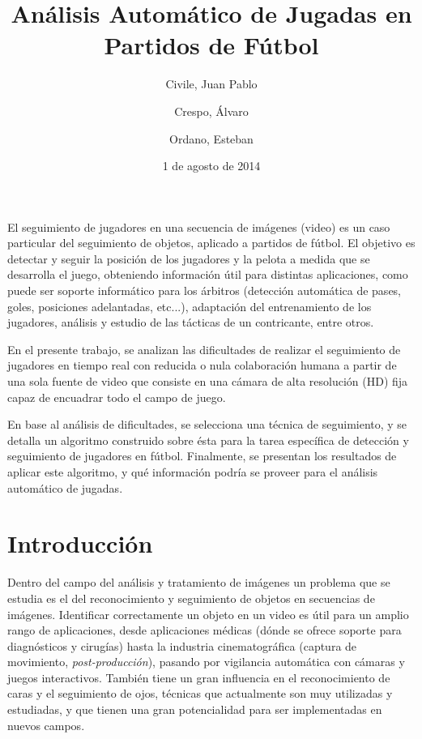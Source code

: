 \documentclass[a4paper,11pt]{report}
\title{Análisis Automático de Jugadas en Partidos de Fútbol}
\date{1 de agosto de 2014}
\author{Civile, Juan Pablo \and Crespo, Álvaro \and Ordano, Esteban }
\begin{document}
\pagestyle{fancy}
\maketitle

\addvspace{3em}
\begin{customabstract}
\begin{doublespace}
El seguimiento de jugadores en una secuencia de imágenes (video) es un caso
particular del seguimiento de objetos, aplicado a partidos de fútbol. El
objetivo es detectar y seguir la posición de los jugadores y la pelota a medida
que se desarrolla el juego, obteniendo información útil para distintas
aplicaciones, como puede ser soporte informático para los árbitros (detección
automática de pases, goles, posiciones adelantadas, etc...), adaptación del
entrenamiento de los jugadores, análisis y estudio de las tácticas de un
contricante, entre otros.

En el presente trabajo, se analizan las dificultades de realizar el seguimiento
de jugadores en tiempo real con reducida o nula colaboración humana a partir de
una sola fuente de video que consiste en una cámara de alta resolución (HD)
fija capaz de encuadrar todo el campo de juego.

En base al análisis de dificultades, se selecciona una técnica de seguimiento,
y se detalla un algoritmo construido sobre ésta para la tarea específica de
detección y seguimiento de jugadores en fútbol. Finalmente, se presentan los
resultados de aplicar este algoritmo, y qué información podría se proveer
para el análisis automático de jugadas.
\end{doublespace}
\end{customabstract}

\tableofcontents

\chapter*{Introducción}

Dentro del campo del análisis y tratamiento de imágenes un problema que se
estudia es el del reconocimiento y seguimiento de objetos en secuencias de
imágenes. Identificar correctamente un objeto en un video es útil para un
amplio rango de aplicaciones, desde aplicaciones médicas (dónde se ofrece
soporte para diagnósticos y cirugías) hasta la industria cinematográfica
(captura de movimiento, \textit{post-producción}), pasando por vigilancia
automática con cámaras y juegos interactivos. También tiene un gran
influencia en el reconocimiento de caras y el seguimiento de ojos, técnicas
que actualmente son muy utilizadas y estudiadas, y que tienen una gran
potencialidad para ser implementadas en nuevos campos.
\end{document}
